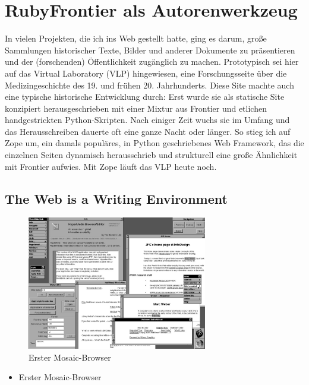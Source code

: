 \documentclass[11pt]{report}
\begin{document}
\chapter{RubyFrontier als Autorenwerkzeug}
\label{sec-2-6}


In vielen Projekten, die ich ins Web gestellt hatte, ging es darum,
große Sammlungen historischer Texte, Bilder und anderer Dokumente zu
präsentieren und der (forschenden) Öffentlichkeit zugänglich zu
machen. Prototypisch sei hier auf das Virtual Laboratory (VLP)
hingewiesen, eine Forschungsseite über die Medizingeschichte
des 19. und frühen 20. Jahrhunderts. Diese Site machte auch eine
typische historische Entwicklung durch: Erst wurde sie als statische
Site konzipiert herausgeschrieben mit einer Mixtur aus Frontier und
etlichen handgestrickten Python-Skripten. Nach einiger Zeit wuchs sie
im Umfang und das Herausschreiben dauerte oft eine ganze Nacht oder
länger. So stieg ich auf Zope um, ein damals populäres, in Python
geschriebenes Web Framework, das die einzelnen Seiten dynamisch
herausschrieb und strukturell eine große Ähnlichkeit mit Frontier
aufwies. Mit Zope läuft das VLP heute noch.
\section{The Web is a Writing Environment}
\label{sec-2-6-1}


\begin{figure}[h!]
\centering
\includegraphics[width=0.7\textwidth]{./images/mosaicfrueheversion.jpg}
\caption{\label{mosaicfrueheversion}Erster Mosaic-Browser}
\end{figure}

\begin{itemize}
\item Erster Mosaic-Browser
\end{itemize}
\end{document}
